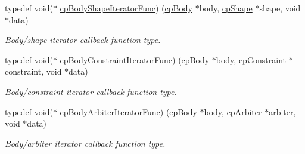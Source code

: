 \begin{DoxyCompactItemize}
\mbox{\label{group__cpBody_gacc4f466cbeaa87fc8b05c0357e1e316d}} 
typedef void($\ast$ \hyperlink{group__cpBody_gacc4f466cbeaa87fc8b05c0357e1e316d}{cp\+Body\+Shape\+Iterator\+Func}) (\hyperlink{structcpBody}{cp\+Body} $\ast$body, \hyperlink{structcpShape}{cp\+Shape} $\ast$shape, void $\ast$data)
\begin{DoxyCompactList}\small\item\em Body/shape iterator callback function type. \end{DoxyCompactList}\item 
\mbox{\label{group__cpBody_ga8cacab9a606b0dbb1dad405bb0d7ba12}} 
typedef void($\ast$ \hyperlink{group__cpBody_ga8cacab9a606b0dbb1dad405bb0d7ba12}{cp\+Body\+Constraint\+Iterator\+Func}) (\hyperlink{structcpBody}{cp\+Body} $\ast$body, \hyperlink{structcpConstraint}{cp\+Constraint} $\ast$constraint, void $\ast$data)
\begin{DoxyCompactList}\small\item\em Body/constraint iterator callback function type. \end{DoxyCompactList}\item 
\mbox{\label{group__cpBody_gac655e03d7b2d7fd0a870a702f9de0026}} 
typedef void($\ast$ \hyperlink{group__cpBody_gac655e03d7b2d7fd0a870a702f9de0026}{cp\+Body\+Arbiter\+Iterator\+Func}) (\hyperlink{structcpBody}{cp\+Body} $\ast$body, \hyperlink{structcpArbiter}{cp\+Arbiter} $\ast$arbiter, void $\ast$data)
\begin{DoxyCompactList}\small\item\em Body/arbiter iterator callback function type. \end{DoxyCompactList}\end{DoxyCompactItemize}
